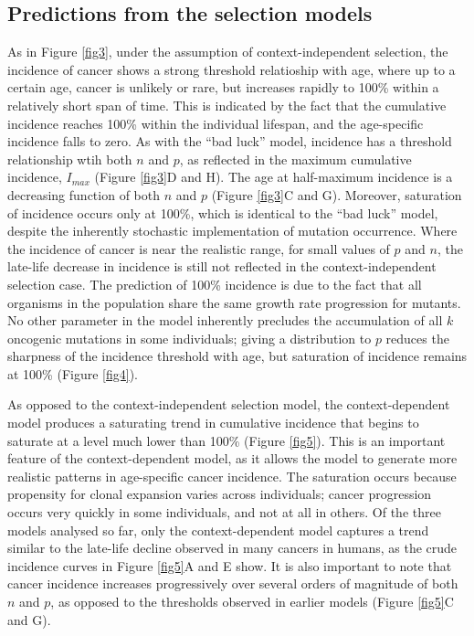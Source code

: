\documentclass[9pt,twocolumn,twoside]{pnas-new}
\begin{document}
\subsection{Predictions from the selection models}
As in Figure \ref{fig3}, under the assumption of context-independent selection, the incidence of cancer shows a strong threshold relatioship with age, where up to a certain age, cancer is unlikely or rare, but increases rapidly to 100\% within a relatively short span of time. This is indicated by the fact that the cumulative incidence reaches 100\% within the individual lifespan, and the age-specific incidence falls to zero. As with the ``bad luck'' model, incidence has a threshold relationship wtih both $n$ and $p$, as reflected in the maximum cumulative incidence, $I_{max}$ (Figure \ref{fig3}D and H). The age at half-maximum incidence is a decreasing function of both $n$ and $p$ (Figure \ref{fig3}C and G). Moreover, saturation of incidence occurs only at 100\%, which is identical to the ``bad luck'' model, despite the inherently stochastic implementation of mutation occurrence. Where the incidence of cancer is near the realistic range, for small values of $p$ and $n$, the late-life decrease in incidence is still not reflected in the context-independent selection case. The prediction of 100\% incidence is due to the fact that all organisms in the population share the same growth rate progression for mutants. No other parameter in the model inherently precludes the accumulation of all $k$ oncogenic mutations in some individuals; giving a distribution to $p$ reduces the sharpness of the incidence threshold with age, but saturation of incidence remains at 100\% (Figure \ref{fig4}). 

As opposed to the context-independent selection model, the context-dependent model produces a saturating trend in cumulative incidence that begins to saturate at a level much lower than 100\% (Figure \ref{fig5}). This is an important feature of the context-dependent model, as it allows the model to generate more realistic patterns in age-specific cancer incidence. The saturation occurs because propensity for clonal expansion varies across individuals; cancer progression occurs very quickly in some individuals, and not at all in others. Of the three models analysed so far, only the context-dependent model captures a trend similar to the late-life decline observed in many cancers in humans, as the crude incidence curves in Figure \ref{fig5}A and E show. It is also important to note that cancer incidence increases progressively over several orders of magnitude of both $n$ and $p$, as opposed to the thresholds observed in earlier models (Figure \ref{fig5}C and G).
\end{document}
